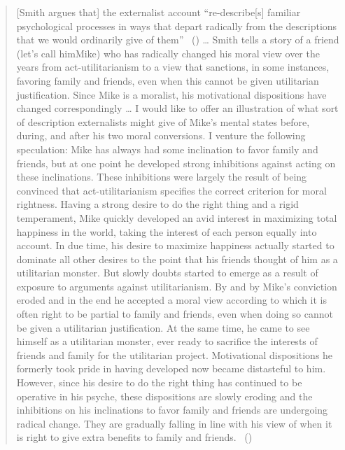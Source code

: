 \documentclass[
  10pt,
  letterpaper,
  twoside]{scrbook}
\begin{document}
\begin{quote}
{[}Smith argues that{]} the externalist account ``re-describe{[}s{]}
familiar psychological processes in ways that depart radically from the
descriptions that we would ordinarily give of them''
~() \ldots{} Smith tells a
story of a friend (let's call him{Mike}) who has radically changed his
moral view over the years from act-utilitarianism to a view that
sanctions, in some instances, favoring family and friends, even when
this cannot be given utilitarian justification. Since {Mike} is a
moralist, his motivational dispositions have changed correspondingly
\ldots{} I would like to offer an illustration of what sort of
description externalists might give of {Mike}'s mental states before,
during, and after his two moral conversions. I venture the following
speculation: {Mike} has always had some inclination to favor family and
friends, but at one point he developed strong inhibitions against acting
on these inclinations. These inhibitions were largely the result of
being convinced that act-utilitarianism specifies the correct criterion
for moral rightness. Having a strong desire to do the right thing and a
rigid temperament, {Mike} quickly developed an avid interest in
maximizing total happiness in the world, taking the interest of each
person equally into account. In due time, his desire to maximize
happiness actually started to dominate all other desires to the point
that his friends thought of him as a utilitarian monster. But slowly
doubts started to emerge as a result of exposure to arguments against
utilitarianism. By and by {Mike}'s conviction eroded and in the end he
accepted a moral view according to which it is often right to be partial
to family and friends, even when doing so cannot be given a utilitarian
justification. At the same time, he came to see himself as a utilitarian
monster, ever ready to sacrifice the interests of friends and family for
the utilitarian project. Motivational dispositions he formerly took
pride in having developed now became distasteful to him. However, since
his desire to do the right thing has continued to be operative in his
psyche, these dispositions are slowly eroding and the inhibitions on his
inclinations to favor family and friends are undergoing radical change.
They are gradually falling in line with his view of when it is right to
give extra benefits to family and friends.
~()
\end{quote}
\end{document}
